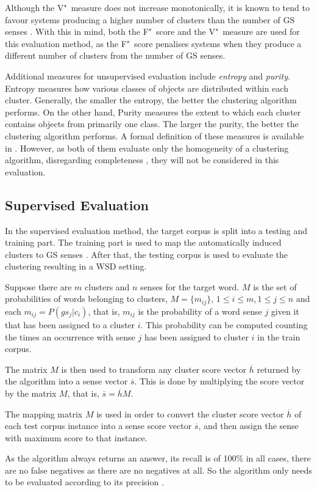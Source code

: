 Although the V"~measure does not increase monotonically, it is known to tend to
favour systems producing a higher number of clusters than the number of \ac{GS}
senses \citep{manandhar2010semeval}. With this in mind, both the F"~score and 
the
V"~measure are used for this evaluation method, as the F"~score penalises 
systems
when they produce a different number of clusters from the number of \ac{GS}
senses.

Additional measures for unsupervised evaluation include \textit{entropy} and
\textit{purity}. Entropy measures how various classes of objects are
distributed within each cluster. Generally, the smaller the entropy, the better
the clustering algorithm performs. On the other hand, Purity measures the extent
to which each cluster contains objects from primarily one class. The larger the
purity, the better the clustering algorithm performs. A formal definition of
these measures is available in \citep{zhao2005hierarchical}. However, as both of
them evaluate only the homogeneity of a clustering algorithm, disregarding
completeness \citep{manandhar2009semeval}, they will not be considered in this
evaluation.

\subsection{Supervised Evaluation}
\label{subsec:supeval}

In the supervised evaluation method, the target corpus is split into a testing
and training part. The training part is used to map the automatically induced
clusters to \ac{GS} senses \citep{agirre2006evaluating}. After that, the testing
corpus is used to evaluate the clustering resulting in a \ac{WSD} setting.

Suppose there are $m$ clusters and $n$ senses for the target word. $M$ is the
set of probabilities of words belonging to clusters, $M = \{m_{ij}\}$, $1 \leq i
\leq m, 1 \leq j \leq n$ and each $m_{ij} = P(gs_j|c_i)$, that is, $m_{ij}$ is
the probability of a word sense $j$ given it that has been assigned to a cluster
$i$. This probability can be computed counting the times an occurrence with
sense $j$ has been assigned to cluster $i$ in the train corpus.

The matrix $M$ is then used to transform any cluster score vector $\overline{h}$
returned by the algorithm into a sense vector $\overline{s}$. This is done by
multiplying the score vector by the matrix $M$, that is, $\overline{s} =
\overline{h}M$.

The mapping matrix $M$ is used in order to convert the cluster score vector
$\overline{h}$ of each test corpus instance into a sense score vector
$\overline{s}$, and then assign the sense with maximum score to that instance.

As the algorithm always returns an answer, its recall is of 100\% in all
cases, there are no false negatives as there are no negatives at all. So the
algorithm only needs to be evaluated according to its precision
\citep{agirre2006evaluating}.


